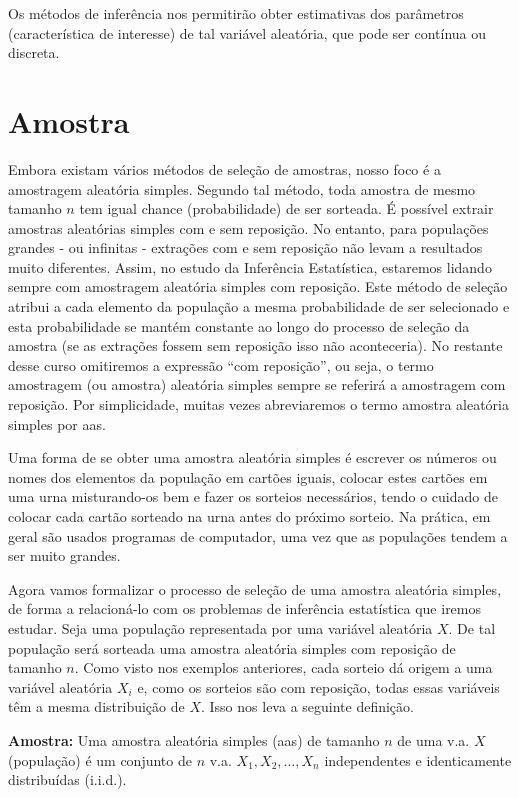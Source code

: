 \documentclass[
]{book}
\begin{document}
Os métodos de inferência nos permitirão obter estimativas dos parâmetros (característica de interesse) de tal variável aleatória, que pode ser contínua ou discreta.

\hypertarget{amostra}{%
\section{Amostra}\label{amostra}}

Embora existam vários métodos de seleção de amostras, nosso foco é a amostragem aleatória simples. Segundo tal método, toda amostra de mesmo tamanho \(n\) tem igual chance (probabilidade) de ser sorteada. É possível extrair amostras aleatórias simples com e sem reposição. No entanto, para populações grandes - ou infinitas - extrações com e sem reposição não levam a resultados muito diferentes. Assim, no estudo da Inferência Estatística, estaremos lidando sempre com amostragem aleatória simples com reposição. Este método de seleção atribui a cada elemento da população a mesma probabilidade de ser selecionado e esta probabilidade se mantém constante ao longo do processo de seleção da amostra (se as extrações fossem sem reposição isso não aconteceria). No restante desse curso omitiremos a expressão ``com reposição'', ou seja, o termo amostragem (ou amostra) aleatória simples sempre se referirá a amostragem com reposição. Por simplicidade, muitas vezes abreviaremos o termo amostra aleatória simples por aas.

Uma forma de se obter uma amostra aleatória simples é escrever os números ou nomes dos elementos da população em cartões iguais, colocar estes cartões em uma urna misturando-os bem e fazer os sorteios necessários, tendo o cuidado de colocar cada cartão sorteado na urna antes do próximo sorteio. Na prática, em geral são usados programas de computador, uma vez que as populações tendem a ser muito grandes.

Agora vamos formalizar o processo de seleção de uma amostra aleatória simples, de forma a relacioná-lo com os problemas de inferência estatística que iremos estudar. Seja uma população representada por uma variável aleatória \(X\). De tal população será sorteada uma amostra aleatória simples com reposição de tamanho \(n\). Como visto nos exemplos anteriores, cada sorteio dá origem a uma variável aleatória \(X_i\) e, como os sorteios são com reposição, todas essas variáveis têm a mesma distribuição de \(X\). Isso nos leva a seguinte definição.

\textbf{Amostra:} Uma amostra aleatória simples (aas) de tamanho \(n\) de uma v.a. \(X\) (população) é um conjunto de \(n\) v.a. \(X_1, X_2, \ldots, X_n\) independentes e identicamente distribuídas (i.i.d.).
\end{document}
